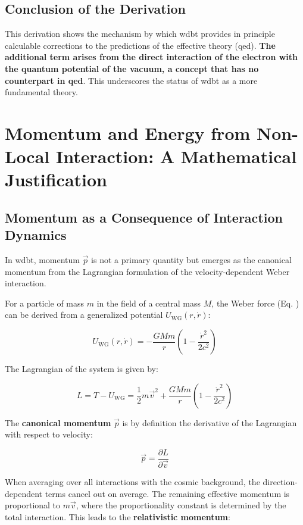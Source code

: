 \section{Conclusion of the Derivation}
This derivation shows the mechanism by which \gls{wdbt} provides in principle calculable corrections to the predictions of the effective theory (\gls{qed}). \textbf{The additional term arises from the direct interaction of the electron with the quantum potential of the vacuum, a concept that has no counterpart in \gls{qed}}. This underscores the status of \gls{wdbt} as a more fundamental theory.

\chapter{Momentum and Energy from Non-Local Interaction: A Mathematical Justification}
\section{Momentum as a Consequence of Interaction Dynamics}
In \gls{wdbt}, momentum $\vec{p}$ is not a primary quantity but emerges as the canonical momentum from the Lagrangian formulation of the velocity-dependent Weber interaction.

For a particle of mass $m$ in the field of a central mass $M$, the Weber force (Eq. ) can be derived from a generalized potential $U_\text{WG}(r,\dot{r})$:

\begin{equation}
    U_{\mathrm{WG}}(r, \dot{r}) = -\frac{GMm}{r} \left( 1 - \frac{\dot{r}^2}{2c^2} \right)
\end{equation}

The Lagrangian of the system is given by:

\begin{equation}
    L = T - U_{\mathrm{WG}} = \frac{1}{2}m\vec{v}^2 + \frac{GMm}{r} \left( 1 - \frac{\dot{r}^2}{2c^2} \right)
\end{equation}

The \textbf{canonical momentum} $\vec{p}$ is by definition the derivative of the Lagrangian with respect to velocity:

\begin{equation}
    \vec{p} = \frac{\partial L}{\partial \vec{v}}
\end{equation}

When averaging over all interactions with the cosmic background, the direction-dependent terms cancel out on average. The remaining effective momentum is proportional to $m\vec{v}$, where the proportionality constant is determined by the total interaction. This leads to the \textbf{relativistic momentum}:


